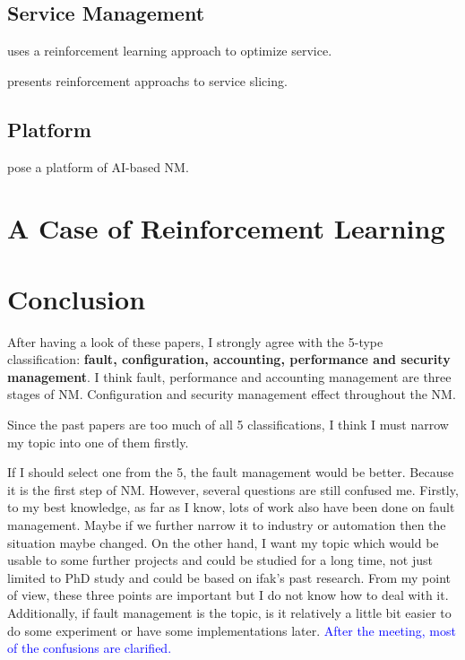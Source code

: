 \documentclass[journal,UTF8]{IEEEtran}
\begin{document}
\cite{Zheng2016Cognitive,J2018AI}





\subsection{Service Management}
\cite{Rovcanin2015Experimental} uses a reinforcement learning approach to optimize service.

\cite{Zhao2018Deep,Xianfu2018Multi} presents reinforcement approachs to service slicing. 

\subsection{Platform}
\cite{Ren2018Low} pose a platform of AI-based NM.


\section{A Case of Reinforcement Learning}



\section{Conclusion}
\label{conclusion}
After having a look of these papers, I strongly agree with the 5-type classification: \textbf{fault, configuration, accounting, performance and security management}. I think fault, performance and accounting management are three stages of NM. Configuration and security management effect throughout the NM. 

Since the past papers are too much of all 5 classifications, I think I must narrow my topic into one of them firstly. 

If I should select one from the 5, the fault management would be better. Because it is the first step of NM. However, several questions are still confused me. Firstly, to my best knowledge, as far as I know, lots of work also have been done on fault management. Maybe if we further narrow it to industry or automation then the situation maybe changed. On the other hand, I want my topic which would be usable to some further projects and could be studied for a long time, not just limited to PhD study and could be based on ifak's past research. From my point of view, these three points are important but I do not know how to deal with it. Additionally, if fault management is the topic, is it relatively a little bit easier to do some experiment or have some implementations later. \textcolor{blue}{After the meeting, most of the confusions are clarified.} 
\end{document}
